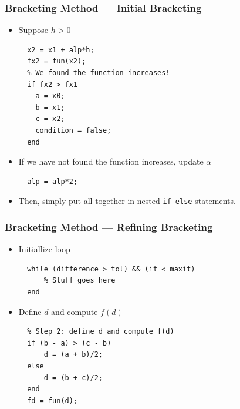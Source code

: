 \documentclass[11pt,xcolor={svgnames},aspectratio=169,usepdftitle=false]{beamer}
\begin{document}
\begin{frame}[fragile]
  \frametitle{Bracketing Method --- Initial Bracketing}
\begin{itemize}
  \item Suppose $h > 0$
  \begin{lstlisting}
  x2 = x1 + alp*h;
  fx2 = fun(x2);
  % We found the function increases!
  if fx2 > fx1
    a = x0;
    b = x1;
    c = x2;
    condition = false;
  end
  \end{lstlisting}
  \item If we have not found the function increases, update $\alpha$
  \begin{lstlisting}
  alp = alp*2;
  \end{lstlisting}
  \item Then, simply put all together in nested \verb;if-else; statements.
\end{itemize}
\end{frame}

\begin{frame}[fragile]
  \frametitle{Bracketing Method --- Refining Bracketing}
\begin{itemize}
  \item Initiallize loop
  \begin{lstlisting}
  while (difference > tol) && (it < maxit)
      % Stuff goes here
  end
  \end{lstlisting}
  \item Define $d$ and compute $f(d)$
  \begin{lstlisting}
  % Step 2: define d and compute f(d)
  if (b - a) > (c - b)
      d = (a + b)/2;
  else
      d = (b + c)/2;
  end
  fd = fun(d);
  \end{lstlisting}
\end{itemize}
\end{frame}
\end{document}
